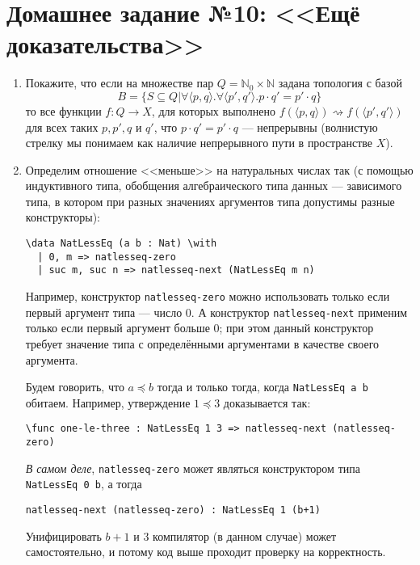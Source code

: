 \documentclass[10pt,a4paper,oneside]{article}
\begin{document}
\section*{Домашнее задание №10: <<Ещё доказательства>>}

\begin{enumerate}
\item Покажите, что если на множестве пар $Q = \mathbb{N}_0 \times \mathbb{N}$ задана топология
с базой $$B = \{ S \subseteq Q | \forall \langle p,q \rangle.\forall \langle p',q' \rangle.p\cdot q' = p' \cdot q \}$$
то все функции $f: Q \rightarrow X$, для которых выполнено $f(\langle p,q\rangle) \rightsquigarrow f(\langle p',q'\rangle)$ для всех 
таких $p,p',q$ и $q'$, что $p\cdot q' = p'\cdot q$ --- непрерывны (волнистую стрелку мы понимаем как наличие непрерывного пути
в пространстве $X$). 

\item Определим отношение <<меньше>> на натуральных числах так (с помощью индуктивного типа, обобщения алгебраического типа данных ---
зависимого типа, в котором при разных значениях аргументов типа допустимы разные конструкторы):
\begin{verbatim}
\data NatLessEq (a b : Nat) \with
  | 0, m => natlesseq-zero
  | suc m, suc n => natlesseq-next (NatLessEq m n)
\end{verbatim}
                                                                                                      
Например, конструктор \verb!natlesseq-zero! можно использовать только если первый аргумент типа --- число 0.
А конструктор \verb!natlesseq-next! применим только если первый аргумент больше 0; при этом данный конструктор
требует значение типа с определёнными аргументами в качестве своего аргумента.

Будем говорить, что $a \preceq b$ тогда и только тогда, когда \verb!NatLessEq a b! обитаем.
Например, утверждение $1 \preceq 3$ доказывается так:

\begin{center}\verb!\func one-le-three : NatLessEq 1 3 => natlesseq-next (natlesseq-zero)!\end{center}

\emph{В самом деле}, \verb!natlesseq-zero! может являться конструктором типа \verb!NatLessEq 0 b!,
а тогда \begin{center}\verb!natlesseq-next (natlesseq-zero) : NatLessEq 1 (b+1)!\end{center} Унифицировать $b+1$ и $3$
компилятор (в данном случае) может самостоятельно, и потому код выше проходит проверку на корректность.


\end{enumerate}
\end{document}
